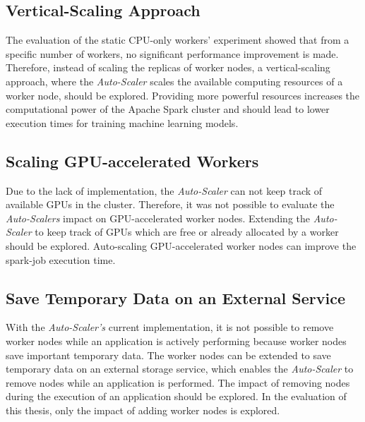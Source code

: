 \subsection{Vertical-Scaling Approach}
The evaluation of the static CPU-only workers' experiment showed that from a specific number of workers, no significant performance improvement is made.
Therefore, instead of scaling the replicas of worker nodes, a vertical-scaling approach, where the \textit{Auto-Scaler} scales the available computing resources of a worker node, should be explored.
Providing more powerful resources increases the computational power of the Apache Spark cluster and should lead to lower execution times for training machine learning models.


\subsection{Scaling GPU-accelerated Workers}
\label{subsec:08_outlook_gpus}
Due to the lack of implementation, the \textit{Auto-Scaler} can not keep track of available GPUs in the cluster. Therefore, it was not possible to evaluate the \textit{Auto-Scalers} impact on GPU-accelerated worker nodes.
Extending the \textit{Auto-Scaler} to keep track of GPUs which are free or already allocated by a worker should be explored.
%
Auto-scaling GPU-accelerated worker nodes can improve the spark-job execution time.


\subsection{Save Temporary Data on an External Service}
With the \textit{Auto-Scaler's} current implementation, it is not possible to remove worker nodes while an application is actively performing because worker nodes save important temporary data.
The worker nodes can be extended to save temporary data on an external storage service, which enables the \textit{Auto-Scaler} to remove nodes while an application is performed.
% 
The impact of removing nodes during the execution of an application should be explored. In the evaluation of this thesis, only the impact of adding worker nodes is explored.
